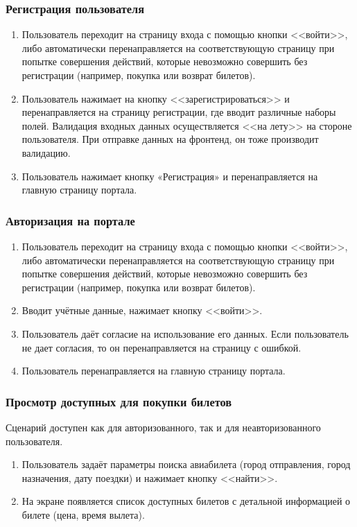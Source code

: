 \subsubsection*{Регистрация пользователя}
\begin{enumerate}
    \item Пользователь переходит на страницу входа с помощью кнопки <<войти>>, либо автоматически перенаправляется на соответствующую страницу при попытке совершения действий, которые невозможно совершить без регистрации (например, покупка или возврат билетов). 
    \item Пользователь нажимает на кнопку <<зарегистрироваться>> и перенаправляется на страницу регистрации, где вводит различные наборы полей. Валидация входных данных осуществляется <<на лету>> на стороне пользователя. При отправке данных на фронтенд, он тоже производит валидацию.
    \item Пользователь нажимает кнопку «Регистрация» и перенаправляется на главную страницу портала.
\end{enumerate}

\subsubsection*{Авторизация на портале}
\begin{enumerate}
    \item Пользователь переходит на страницу входа с помощью кнопки <<войти>>, либо автоматически перенаправляется на соответствующую страницу при попытке совершения действий, которые невозможно совершить без регистрации (например, покупка или возврат билетов). 
    \item Вводит учётные данные, нажимает кнопку <<войти>>.
    \item Пользователь даёт согласие на использование его данных. Если пользователь не дает согласия, то он перенаправляется на страницу с ошибкой.
    \item Пользователь перенаправляется на главную страницу портала.
\end{enumerate} 

\subsubsection*{Просмотр доступных для покупки билетов}
Сценарий доступен как для авторизованного, так и для неавторизованного пользователя.
\begin{enumerate}
    \item Пользователь задаёт параметры поиска авиабилета (город отправления, город назначения, дату поездки) и нажимает кнопку <<найти>>.
    \item На экране появляется список доступных билетов с детальной информацией о билете (цена, время вылета).
\end{enumerate}

